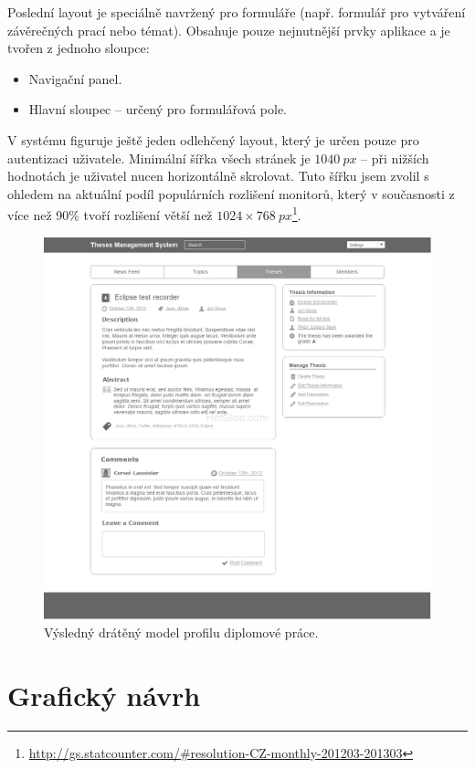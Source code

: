 Poslední layout je speciálně navržený pro formuláře (např. formulář pro vytváření závěrečných prací nebo témat). Obsahuje pouze nejnutnější prvky aplikace a je tvořen z jednoho sloupce:

\begin{itemize}
    \item Navigační panel.
    \item Hlavní sloupec -- určený pro formulářová pole.
\end{itemize}

V systému figuruje ještě jeden odlehčený layout, který je určen pouze pro autentizaci uživatele. Minimální šířka všech stránek je $1040~px$ -- při nižších hodnotách je uživatel nucen horizontálně skrolovat. Tuto šířku jsem zvolil s ohledem na aktuální podíl populárních rozlišení monitorů, který v současnosti z více než 90\% tvoří rozlišení větší než $1024\times768~px$\footnote{\url{http://gs.statcounter.com/\#resolution-CZ-monthly-201203-201303}}.

\begin{figure}[htbp]
    \centering
    \includegraphics[width=\textwidth]{images/main-layout.png}
    \caption{Výsledný drátěný model profilu diplomové práce.}
    \label{img:layout1}
\end{figure}

\section{Grafický návrh}

